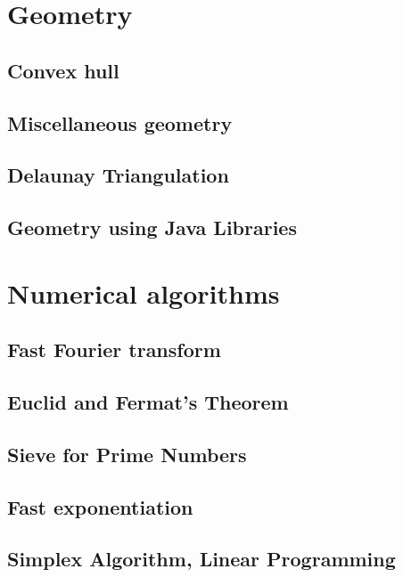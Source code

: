 \section{Geometry}
\subsection{Convex hull}
\raggedbottom
\hrulefill
\subsection{Miscellaneous geometry}
\raggedbottom
\hrulefill
\subsection{Delaunay Triangulation}
\raggedbottom
\hrulefill
\subsection{Geometry using Java Libraries}
\raggedbottom
\hrulefill

\section{Numerical algorithms}
\subsection{Fast Fourier transform}
\raggedbottom
\hrulefill
\subsection{Euclid and Fermat's Theorem}
\raggedbottom
\hrulefill
\subsection{Sieve for Prime Numbers}
\raggedbottom
\hrulefill
\subsection{Fast exponentiation}
\raggedbottom
\hrulefill
\subsection{Simplex Algorithm, Linear Programming}
\raggedbottom
\hrulefill

